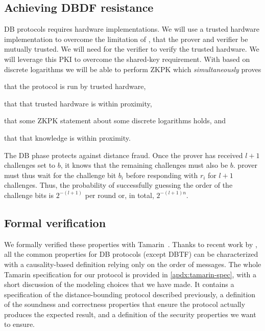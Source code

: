 \subsection{Achieving \acs*{DBDF} resistance}

\Acl{DB} protocols requires hardware implementations.
We will use a trusted hardware implementation to overcome the limitation of 
\textcite{UWBPR}, \ie that the prover and verifier be mutually trusted.
We will need  for the verifier to verify the trusted hardware.
We will leverage this \ac{PKI} to overcome the shared-key requirement.
With  based on discrete logarithms we will be able to perform  
\ac{ZKPK} which \emph{simultaneously} proves
\begin{enumerate*}
\item that the protocol is run by trusted hardware,
\item that that trusted hardware is within proximity,
\item that some \ac{ZKPK} statement about some discrete logarithms holds, and
\item that that knowledge is within proximity.
\end{enumerate*}

The \ac{DB} phase protects against distance fraud.
Once the prover has received \(l+1\) challenges set to \(b\), it knows that the remaining challenges must also be \(b\).
 prover must thus wait for the challenge bit \(b_i\) before responding with \(r_i\) for \(l+1\) challenges.
Thus, the probability of successfully guessing the order of the challenge bits is \(2^{-(l+1)}\) per round or, in total, \(2^{-(l+1)n}\).

\subsection{Formal verification}

We formally verified these properties with Tamarin~\cite{meier2013tamarin}.
Thanks to recent work by \textcite{TamarinDB}, all the common properties for 
\ac{DB} protocols (except \ac{DBTF}) can be characterized with a 
causality-based definition relying only on the order of messages.
The whole Tamarin specification for our protocol is provided in 
\cref{apdx:tamarin-spec}, with a short discussion of the modeling choices that 
we have made.
It contains a specification of the distance-bounding protocol described 
previously, a definition of the soundness and correctness properties that 
ensure the protocol actually produces the expected result, and a definition of 
the security properties we want to ensure.

